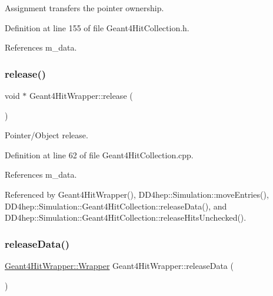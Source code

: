 Assignment transfers the pointer ownership. 



Definition at line 155 of file Geant4\+Hit\+Collection.\+h.



References m\+\_\+data.

\hypertarget{class_d_d4hep_1_1_simulation_1_1_geant4_hit_wrapper_a1af3edf59bb6c955fe91582394854acd}{}\label{class_d_d4hep_1_1_simulation_1_1_geant4_hit_wrapper_a1af3edf59bb6c955fe91582394854acd} 
\subsubsection{\texorpdfstring{release()}{release()}}
{\footnotesize\ttfamily void $\ast$ Geant4\+Hit\+Wrapper\+::release (\begin{DoxyParamCaption}{ }\end{DoxyParamCaption})}



Pointer/\+Object release. 



Definition at line 62 of file Geant4\+Hit\+Collection.\+cpp.



References m\+\_\+data.



Referenced by Geant4\+Hit\+Wrapper(), D\+D4hep\+::\+Simulation\+::move\+Entries(), D\+D4hep\+::\+Simulation\+::\+Geant4\+Hit\+Collection\+::release\+Data(), and D\+D4hep\+::\+Simulation\+::\+Geant4\+Hit\+Collection\+::release\+Hits\+Unchecked().

\hypertarget{class_d_d4hep_1_1_simulation_1_1_geant4_hit_wrapper_acec7d2a18d078071d5714dd4a0c45739}{}\label{class_d_d4hep_1_1_simulation_1_1_geant4_hit_wrapper_acec7d2a18d078071d5714dd4a0c45739} 
\subsubsection{\texorpdfstring{release\+Data()}{releaseData()}}
{\footnotesize\ttfamily \hyperlink{class_d_d4hep_1_1_simulation_1_1_geant4_hit_wrapper_a4779e35eba7d553e0f2d497c49a42ec6}{Geant4\+Hit\+Wrapper\+::\+Wrapper} Geant4\+Hit\+Wrapper\+::release\+Data (\begin{DoxyParamCaption}{ }\end{DoxyParamCaption})}



